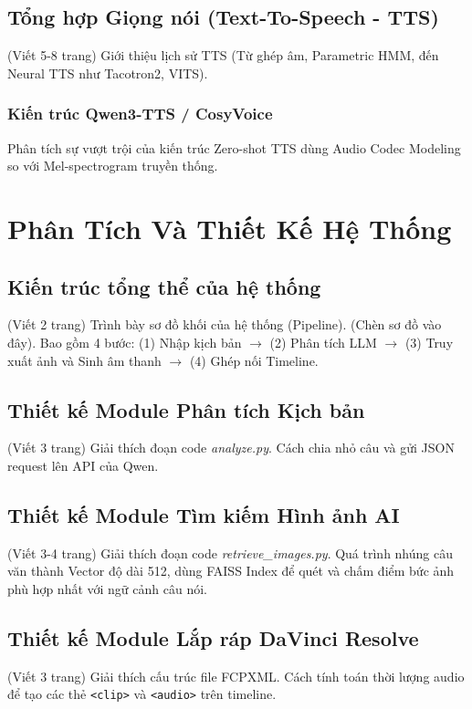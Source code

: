 \documentclass[a4paper,13pt]{report}
\begin{document}
\section{Tổng hợp Giọng nói (Text-To-Speech - TTS)}
(Viết 5-8 trang)
Giới thiệu lịch sử TTS (Từ ghép âm, Parametric HMM, đến Neural TTS như Tacotron2, VITS).
\subsection{Kiến trúc Qwen3-TTS / CosyVoice}
Phân tích sự vượt trội của kiến trúc Zero-shot TTS dùng Audio Codec Modeling so với Mel-spectrogram truyền thống. 

\chapter{Phân Tích Và Thiết Kế Hệ Thống}

\section{Kiến trúc tổng thể của hệ thống}
(Viết 2 trang)
Trình bày sơ đồ khối của hệ thống (Pipeline). (Chèn sơ đồ vào đây).
Bao gồm 4 bước: (1) Nhập kịch bản $\rightarrow$ (2) Phân tích LLM $\rightarrow$ (3) Truy xuất ảnh và Sinh âm thanh $\rightarrow$ (4) Ghép nối Timeline.

\section{Thiết kế Module Phân tích Kịch bản}
(Viết 3 trang)
Giải thích đoạn code \textit{analyze.py}. Cách chia nhỏ câu và gửi JSON request lên API của Qwen.

\section{Thiết kế Module Tìm kiếm Hình ảnh AI}
(Viết 3-4 trang)
Giải thích đoạn code \textit{retrieve\_images.py}. Quá trình nhúng câu văn thành Vector độ dài 512, dùng FAISS Index để quét và chấm điểm bức ảnh phù hợp nhất với ngữ cảnh câu nói.

\section{Thiết kế Module Lắp ráp DaVinci Resolve}
(Viết 3 trang)
Giải thích cấu trúc file FCPXML. Cách tính toán thời lượng audio để tạo các thẻ \texttt{<clip>} và \texttt{<audio>} trên timeline.
\end{document}
